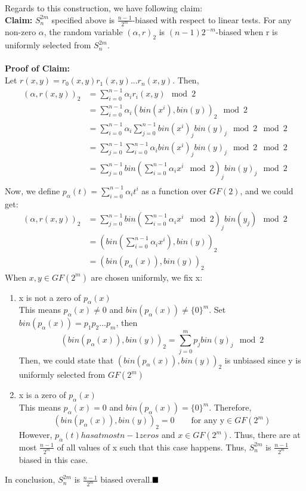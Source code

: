 \documentclass[a4paper, english]{paper}
\begin{document}
 Regards to this construction, we have following claim:\\
\noindent\textbf{Claim:} $S^{2m}_n$ specified above is $\frac{n-1}{2^m}$-biased with respect to linear tests. For any non-zero $\alpha$, the random variable $(\alpha,r)_2$ is $(n-1)2^{-m}$-biased when r is uniformly selected from $S^{2m}_n$.\\\\
\noindent\textbf{Proof of Claim:}\\
Let $r(x,y)=r_0(x,y)r_1(x,y)...r_n(x,y)$. Then, 
\begin{align*}
(\alpha,r(x,y))_2 &= \sum_{i=0}^{n-1}\alpha_ir_i(x,y) \mod 2\\
&= \sum_{i=0}^{n-1}\alpha_i(bin(x^i),bin(y))_2 \mod 2\\
&= \sum_{i=0}^{n-1}\alpha_i \sum_{j=0}^{n-1}bin(x^i)_jbin(y)_j \mod2 \mod 2\\
&= \sum_{j=0}^{n-1}\sum_{i=0}^{n-1}\alpha_i bin(x^i)_jbin(y)_j \mod2 \mod 2\\
&= \sum_{j=0}^{n-1}bin\left(\sum_{i=0}^{n-1}\alpha_i x^i \mod2 \right)_jbin(y)_j \mod 2\\
\end{align*}
\quad Now, we define $p_\alpha(t) = \sum_{i=0}^{n-1}\alpha_i t^i$ as a function over $GF(2)$, and we could get:
\begin{align*}
(\alpha,r(x,y))_2 
&= \sum_{j=0}^{n-1}bin\left(\sum_{i=0}^{n-1}\alpha_i x^i \mod2 \right)_jbin(y_j) \mod 2\\
&= (bin(\sum_{i=0}^{n-1}\alpha_i x^i),bin(y))_2\\
&= (bin(p_\alpha(x)), bin(y))_2
\end{align*}
When $x,y\in GF(2^m)$ are chosen uniformly, we fix x:
\begin{enumerate}
\item x is not a zero of $p_\alpha(x)$\\
This means $p_\alpha(x)\ne 0$ and $bin(p_\alpha(x))\ne\{0\}^m$. Set $bin(p_\alpha(x))=p_1p_2...p_{m}$, then 
$$(bin(p_\alpha(x)), bin(y))_2 = \sum_{j=0}^m p_jbin(y)_j \mod 2$$
Then, we could state that $(bin(p_\alpha(x)), bin(y))_2$ is unbiased since y is uniformly selected from $GF(2^m)$
\item x is a zero of $p_\alpha(x)$\\
This means $p_\alpha(x)= 0$ and $bin(p_\alpha(x))=\{0\}^m$. Therefore,$$(bin(p_\alpha(x)), bin(y))_2 = 0 \qquad\text{for any y}\in GF(2^m)$$
However, $p_\alpha(t)has at most n-1 zeros$ and $x\in GF(2^m)$. Thus, there are at most $\frac{n-1}{2^m}$ of all values of x such that this case happens. Thus, $S^{2m}_n$ is $\frac{n-1}{2^m}$ biased in this case.
\end{enumerate}
\quad In conclusion, $S^{2m}_n$ is $\frac{n-1}{2^m}$ biased overall.$\hfill\blacksquare$ \\
\end{document}
